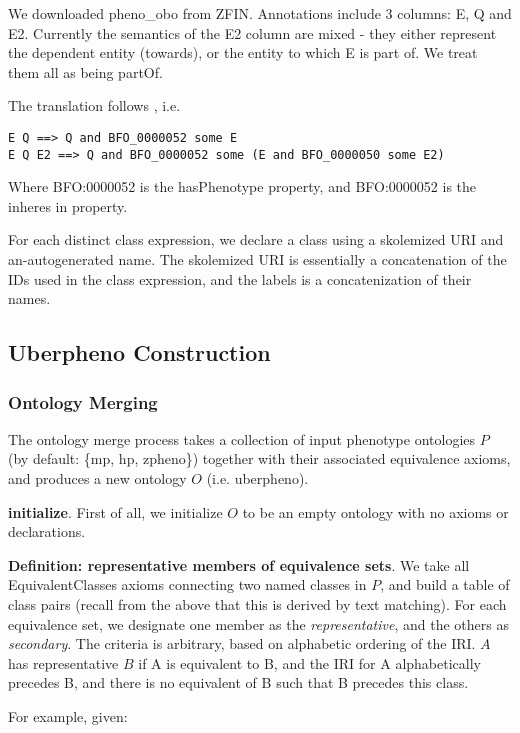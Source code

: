 We downloaded pheno_obo from ZFIN. Annotations include 3 columns: E, Q
and E2. Currently the semantics of the E2 column are mixed - they
either represent the dependent entity (towards), or the entity to
which E is part of. We treat them all as being partOf.

The translation follows \cite{MungallPheno2009}, i.e.

\begin{verbatim}
E Q ==> Q and BFO_0000052 some E
E Q E2 ==> Q and BFO_0000052 some (E and BFO_0000050 some E2)
\end{verbatim}

Where BFO:0000052 is the hasPhenotype property, and BFO:0000052 is the
inheres in property.

For each distinct class expression, we declare a class using a
skolemized URI and an-autogenerated name. The skolemized URI is
essentially a concatenation of the IDs used in the class expression,
and the labels is a concatenization of their names.

\subsection{Uberpheno Construction}

\subsubsection{Ontology Merging}

The ontology merge process takes a collection of input phenotype
ontologies $P$ (by default: \{mp, hp, zpheno\}) together with their
associated equivalence axioms, and produces a new ontology $O$
(i.e. uberpheno).

\textbf{initialize}. First of all, we initialize $O$ to be an empty
ontology with no axioms or declarations.

\textbf{Definition: representative members of equivalence sets}. We take all
EquivalentClasses axioms connecting two named classes in $P$, and
build a table of class pairs (recall from the above that this is
derived by text matching). For each equivalence set, we designate one
member as the \emph{representative}, and the others as
\emph{secondary}. The criteria is arbitrary, based on alphabetic
ordering of the IRI. $A$ has representative $B$ if A is equivalent
to B, and the IRI for A alphabetically precedes B, and there is no
equivalent of B such that B precedes this class.

For example, given:

